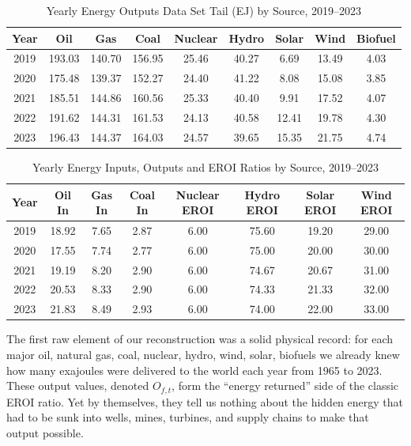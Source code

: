 \documentclass[a4paper,12pt]{article}
\begin{document}
\begin{table}[H]
\centering
\footnotesize
\begin{tabular}{|c|ccc|ccc|cc|}
\hline
\textbf{Year} & \textbf{Oil} & \textbf{Gas} & \textbf{Coal} 
              & \textbf{Nuclear} & \textbf{Hydro} & \textbf{Solar} 
              & \textbf{Wind} & \textbf{Biofuel} \\
\hline
2019 & 193.03 & 140.70 & 156.95 & 25.46 & 40.27 & 6.69 & 13.49 & 4.03 \\
2020 & 175.48 & 139.37 & 152.27 & 24.40 & 41.22 & 8.08 & 15.08 & 3.85 \\
2021 & 185.51 & 144.86 & 160.56 & 25.33 & 40.40 & 9.91 & 17.52 & 4.07 \\
2022 & 191.62 & 144.31 & 161.53 & 24.13 & 40.58 & 12.41 & 19.78 & 4.30 \\
2023 & 196.43 & 144.37 & 164.03 & 24.57 & 39.65 & 15.35 & 21.75 & 4.74 \\
\hline
\end{tabular}
\caption{Yearly Energy Outputs Data Set Tail (EJ) by Source, 2019–2023}
\label{tab:energy_outputs}
\end{table}

\vspace{1em}

\begin{table}[H]
\centering
\footnotesize
\begin{tabular}{|c|ccc|cccc|}
\hline
\textbf{Year} & \textbf{Oil In} & \textbf{Gas In} & \textbf{Coal In}
              & \textbf{Nuclear EROI} & \textbf{Hydro EROI} 
              & \textbf{Solar EROI} & \textbf{Wind EROI} \\
\hline
2019 & 18.92 & 7.65 & 2.87 & 6.00 & 75.60 & 19.20 & 29.00 \\
2020 & 17.55 & 7.74 & 2.77 & 6.00 & 75.00 & 20.00 & 30.00 \\
2021 & 19.19 & 8.20 & 2.90 & 6.00 & 74.67 & 20.67 & 31.00 \\
2022 & 20.53 & 8.33 & 2.90 & 6.00 & 74.33 & 21.33 & 32.00 \\
2023 & 21.83 & 8.49 & 2.93 & 6.00 & 74.00 & 22.00 & 33.00 \\
\hline
\end{tabular}
\caption{Yearly Energy Inputs, Outputs and EROI Ratios by Source, 2019–2023}
\label{tab:eroi_ratios}
\end{table}


The first raw element of our reconstruction was a solid physical record: for each major oil, natural gas, coal, nuclear, hydro, wind, solar, biofuels we already knew how many exajoules were delivered to the world each year from 1965 to 2023. These output values, denoted $O_{f,t}$, form the “energy returned” side of the classic EROI ratio. Yet by themselves, they tell us nothing about the hidden energy that had to be sunk into wells, mines, turbines, and supply chains to make that output possible.
\end{document}
